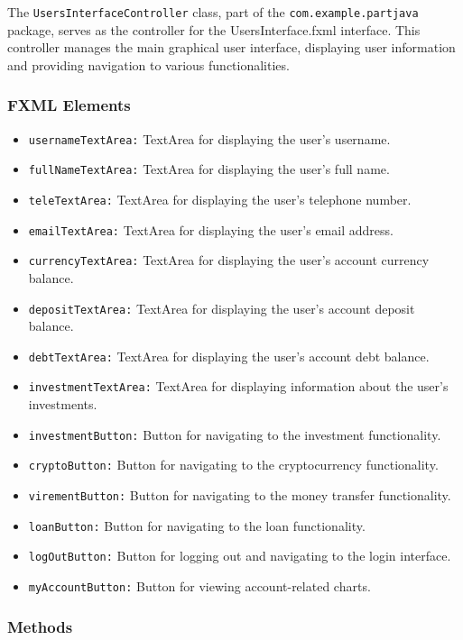 \documentclass{article}
\begin{document}
The \texttt{UsersInterfaceController} class, part of the \texttt{com.example.partjava} package, serves as the controller for the UsersInterface.fxml interface. This controller manages the main graphical user interface, displaying user information and providing navigation to various functionalities.

\subsubsection{FXML Elements}

\begin{itemize}
    \item \texttt{usernameTextArea:} TextArea for displaying the user's username.
    \item \texttt{fullNameTextArea:} TextArea for displaying the user's full name.
    \item \texttt{teleTextArea:} TextArea for displaying the user's telephone number.
    \item \texttt{emailTextArea:} TextArea for displaying the user's email address.
    \item \texttt{currencyTextArea:} TextArea for displaying the user's account currency balance.
    \item \texttt{depositTextArea:} TextArea for displaying the user's account deposit balance.
    \item \texttt{debtTextArea:} TextArea for displaying the user's account debt balance.
    \item \texttt{investmentTextArea:} TextArea for displaying information about the user's investments.
    \item \texttt{investmentButton:} Button for navigating to the investment functionality.
    \item \texttt{cryptoButton:} Button for navigating to the cryptocurrency functionality.
    \item \texttt{virementButton:} Button for navigating to the money transfer functionality.
    \item \texttt{loanButton:} Button for navigating to the loan functionality.
    \item \texttt{logOutButton:} Button for logging out and navigating to the login interface.
    \item \texttt{myAccountButton:} Button for viewing account-related charts.
\end{itemize}

\subsubsection{Methods}
\end{document}
